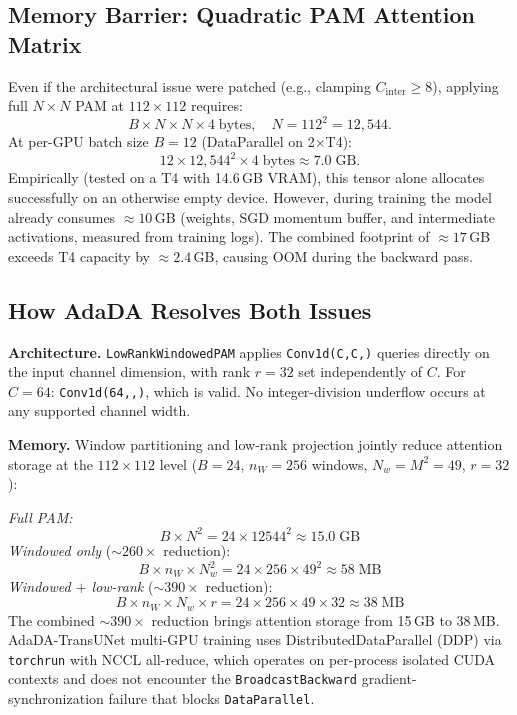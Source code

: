 \documentclass[conference]{IEEEtran}
\begin{document}
\subsection{Memory Barrier: Quadratic PAM Attention Matrix}

Even if the architectural issue were patched (e.g., clamping $C_{\text{inter}} \geq 8$), applying full $N{\times}N$ PAM at $112{\times}112$ requires:
\[
  B \times N \times N \times 4\;\text{bytes},\quad N = 112^2 = 12{,}544.
\]
At per-GPU batch size $B{=}12$ (DataParallel on 2$\times$T4):
\[
  12 \times 12{,}544^2 \times 4\;\text{bytes} \approx 7.0\;\text{GB}.
\]
Empirically (tested on a T4 with 14.6\,GB VRAM), this tensor alone allocates successfully on an otherwise empty device. However, during training the model already consumes ${\approx}10$\,GB (weights, SGD momentum buffer, and intermediate activations, measured from training logs). The combined footprint of ${\approx}17$\,GB exceeds T4 capacity by ${\approx}2.4$\,GB, causing OOM during the backward pass.

\subsection{How AdaDA Resolves Both Issues}

\textbf{Architecture.} \texttt{LowRankWindowedPAM} applies \texttt{Conv1d(C,\;C,)} queries directly on the input channel dimension, with rank $r{=}32$ set independently of $C$. For $C{=}64$: \texttt{Conv1d(64,,)}, which is valid. No integer-division underflow occurs at any supported channel width.

\textbf{Memory.} Window partitioning and low-rank projection jointly reduce attention storage at the $112{\times}112$ level ($B{=}24$, $n_W{=}256$ windows, $N_w{=}M^2{=}49$, $r{=}32$):

\noindent\textit{Full PAM:}
\[
  B \times N^2 = 24 \times 12544^2 \approx 15.0\;\text{GB}
\]
\textit{Windowed only} (${\sim}260{\times}$ reduction):
\[
  B \times n_W \times N_w^2 = 24 \times 256 \times 49^2 \approx 58\;\text{MB}
\]
\textit{Windowed $+$ low-rank} (${\sim}390{\times}$ reduction):
\[
  B \times n_W \times N_w \times r = 24 \times 256 \times 49 \times 32 \approx 38\;\text{MB}
\]
The combined ${\sim}390{\times}$ reduction brings attention storage from 15\,GB to 38\,MB. AdaDA-TransUNet multi-GPU training uses DistributedDataParallel (DDP) via \texttt{torchrun} with NCCL all-reduce, which operates on per-process isolated CUDA contexts and does not encounter the \texttt{BroadcastBackward} gradient-synchronization failure that blocks \texttt{DataParallel}.
\end{document}

